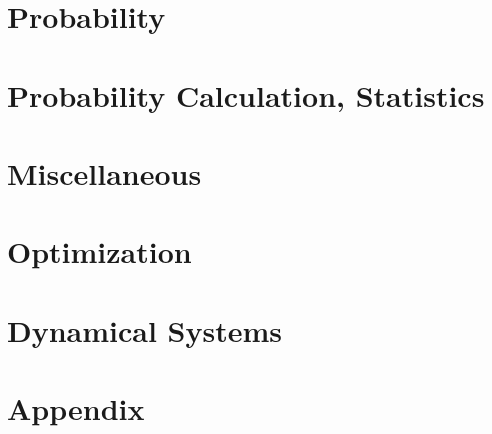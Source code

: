 \documentclass[a4paper]{article}
\begin{document}
\section{Probability}

\section{Probability Calculation, Statistics}

\section{Miscellaneous}

\section{Optimization}

\section{Dynamical Systems}

\section*{Appendix}

\section{}

\section{}
\end{document}
